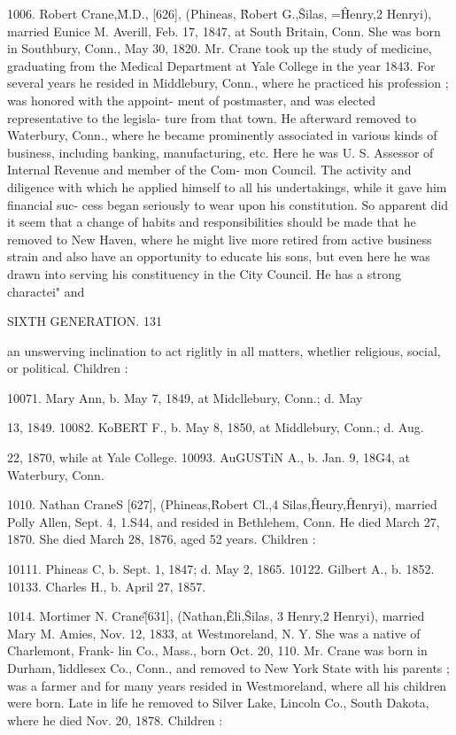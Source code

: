 \documentclass{book}
\begin{document}
1006. Robert Crane,\^ M.D., [626], (Phineas, \^ Robert G.,\^ 
Silas, =\^ Henry,2 Henryi), married Eunice M. Averill, Feb. 17, 
1847, at South Britain, Conn. She was born in Southbury, 
Conn., May 30, 1820. Mr. Crane took up the study of medicine, 
graduating from the Medical Department at Yale College in the 
year 1843. For several years he resided in Middlebury, Conn., 
where he practiced his profession ; was honored with the appoint- 
ment of postmaster, and was elected representative to the legisla- 
ture from that town. He afterward removed to Waterbury, 
Conn., where he became prominently associated in various kinds 
of business, including banking, manufacturing, etc. Here he 
was U. S. Assessor of Internal Revenue and member of the Com- 
mon Council. The activity and diligence with which he applied 
himself to all his undertakings, while it gave him financial suc- 
cess began seriously to wear upon his constitution. So apparent 
did it seem that a change of habits and responsibilities should be 
made that he removed to New Haven, where he might live more 
retired from active business strain and also have an opportunity 
to educate his sons, but even here he was drawn into serving his 
constituency in the City Council. He has a strong charactei" and 



SIXTH GENERATION.  131 

an unswerving inclination to act riglitly in all matters, whetlier 
religious, social, or political. Children : 

10071. Mary Ann, b. May 7, 1849, at Midcllebury, Conn.; d. May 

13, 1849. 
10082. KoBERT F., b. May 8, 1850, at Middlebury, Conn.; d. Aug. 

22, 1870, while at Yale College. 
10093. AuGUSTiN A., b. Jan. 9, 18G4, at Waterbury, Conn. 

1010. Nathan CraneS [627], (Phineas,\^ Robert Cl.,4 Silas,\^ 
Heury,\^ Henryi), married Polly Allen, Sept. 4, 1.S44, and resided 
in Bethlehem, Conn. He died March 27, 1870. She died March 
28, 1876, aged 52 years. Children : 

10111. Phineas C, b. Sept. 1, 1847; d. May 2, 1865. 
10122. Gilbert A., b. 1852. 
10133. Charles H., b. April 27, 1857. 

1014. Mortimer N. Crane\^ [631], (Nathan,\^ Eli,\^ Silas, 3 
Henry,2 Henryi), married Mary M. Amies, Nov. 12, 1833, at 
Westmoreland, N. Y. She was a native of Charlemont, Frank- 
lin Co., Mass., born Oct. 20, 110. Mr. Crane was born in 
Durham, \^liddlesex Co., Conn., and removed to New York State 
with his parents ; was a farmer and for many years resided in 
Westmoreland, where all his children were born. Late in life he 
removed to Silver Lake, Lincoln Co., South Dakota, where he 
died Nov. 20, 1878. Children : 
\end{document}
